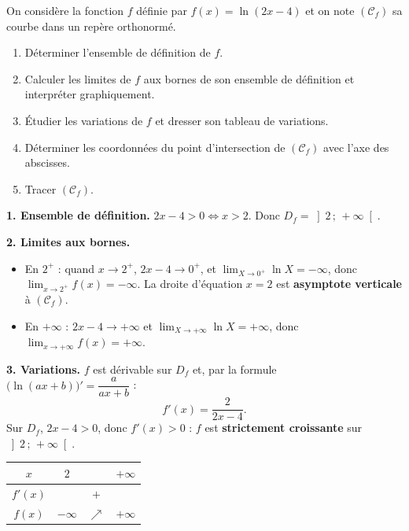 \documentclass[11pt]{article}
\begin{document}
\begin{exoresolu}[Étude complète de $f(x) = \ln(2x - 4)$]
On considère la fonction $f$ définie par $f(x) = \ln(2x-4)$ et on note $(\mathcal{C}_f)$ sa courbe dans un repère orthonormé.
\begin{enumerate}
\item Déterminer l'ensemble de définition de $f$.
\item Calculer les limites de $f$ aux bornes de son ensemble de définition et interpréter graphiquement.
\item Étudier les variations de $f$ et dresser son tableau de variations.
\item Déterminer les coordonnées du point d'intersection de $(\mathcal{C}_f)$ avec l'axe des abscisses.
\item Tracer $(\mathcal{C}_f)$.
\end{enumerate}
\tcblower
\textbf{1. Ensemble de définition.} $2x - 4 > 0 \iff x > 2$. Donc $D_f = \left]2\,;\,+\infty\right[$.

\textbf{2. Limites aux bornes.}
\begin{itemize}
\item En $2^+$ : quand $x \to 2^+$, $2x - 4 \to 0^+$, et $\displaystyle\lim_{X \to 0^+} \ln X = -\infty$, donc $\displaystyle\lim_{x \to 2^+} f(x) = -\infty$. La droite d'équation $\boxed{x = 2}$ est \textbf{asymptote verticale} à $(\mathcal{C}_f)$.
\item En $+\infty$ : $2x - 4 \to +\infty$ et $\displaystyle\lim_{X \to +\infty} \ln X = +\infty$, donc $\displaystyle\lim_{x \to +\infty} f(x) = +\infty$.
\end{itemize}

\textbf{3. Variations.} $f$ est dérivable sur $D_f$ et, par la formule $\bigl(\ln(ax+b)\bigr)' = \dfrac{a}{ax+b}$ :
\[ f'(x) = \frac{2}{2x-4}. \]
Sur $D_f$, $2x - 4 > 0$, donc $f'(x) > 0$ : $f$ est \textbf{strictement croissante} sur $\left]2\,;\,+\infty\right[$.

\begin{center}
\begin{tabular}{|c|ccc|}
\hline
\rowcolor{popblueL} $x$ & $2$ & \hspace{2.5cm} & $+\infty$ \\
\hline
$f'(x)$ & \multicolumn{3}{c|}{$+$} \\
\hline
$f(x)$ & $-\infty$ & $\nearrow$ & $+\infty$ \\
\hline
\end{tabular}
\end{center}


\end{exoresolu}
\end{document}
